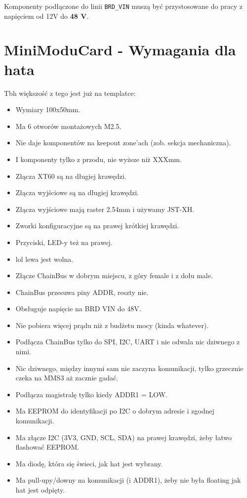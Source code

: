 \documentclass[b5paper, 10pt, twoside]{book}
\begin{document}
Komponenty podłączone do linii \texttt{BRD\_VIN} muszą być przystosowane do pracy z napięciem od 12V do \textbf{48 V}.


\section{MiniModuCard - Wymagania dla hata}
Tbh większość z tego jest już na templatce:

\begin{itemize}
  \item Wymiary 100x50mm.
  \item Ma 6 otworów montażowych M2.5.
  \item Nie daje komponentów na keepout zone'ach (zob. sekcja mechaniczna).
  \item I komponenty tylko z przodu, nie wyższe niż XXXmm. %
  \item Złącza XT60 są na długiej krawędzi.
  \item Złącza wyjściowe są na długiej krawędzi.
  \item Złącza wyjściowe mają raster 2.54mm i używamy JST-XH.
  \item Zworki konfiguracyjne są na prawej krótkiej krawędzi.
  \item Przyciski, LED-y też na prawej.
  \item lol lewa jest wolna.
  \item Złącze ChainBus w dobrym miejscu, z góry female i z dołu male.
  \item ChainBus przesuwa piny ADDR, reszty nie.
  \item Obsługuje napięcie na BRD VIN do 48V.
  \item Nie pobiera więcej prądu niż z budżetu mocy (kinda whatever).
  \item Podłącza ChainBus tylko do SPI, I2C, UART i nie odwala nic dziwnego z nimi.
  \item Nic dziwnego, między innymi sam nie zaczyna komunikacji, tylko grzecznie czeka na MMS3 aż zacznie gadać.
  \item Podłącza magistralę tylko kiedy ADDR1 = LOW.
  \item Ma EEPROM do identyfikacji po I2C o dobrym adresie i zgodnej komunikacji.
  \item Ma złącze I2C (3V3, GND, SCL, SDA) na prawej krawędzi, żeby łatwo flashować EEPROM.
  \item Ma diodę, która się świeci, jak hat jest wybrany.
  \item Ma pull-upy/downy na komunikacji (i ADDR1), żeby nie była floating jak hat jest odpięty.

\end{itemize}
\end{document}
